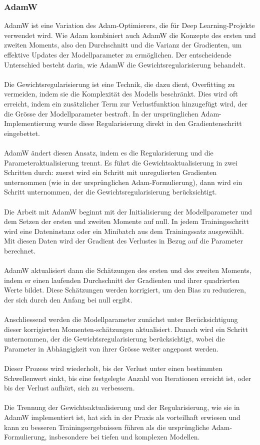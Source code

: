 \documentclass{article}
\begin{document}
\subsubsection{AdamW}
AdamW \cite{loshchilov_decoupled_2019} ist eine Variation des Adam-Optimierers, die für Deep Learning-Projekte verwendet wird. Wie Adam kombiniert auch AdamW die Konzepte des ersten und zweiten Moments, also den Durchschnitt und die Varianz der Gradienten, um effektive Updates der Modellparameter zu ermöglichen. Der entscheidende Unterschied besteht darin, wie AdamW die Gewichtsregularisierung behandelt.\\\\
Die Gewichtsregularisierung ist eine Technik, die dazu dient, Overfitting zu vermeiden, indem sie die Komplexität des Modells beschränkt. Dies wird oft erreicht, indem ein zusätzlicher Term zur Verlustfunktion hinzugefügt wird, der die Grösse der Modellparameter bestraft. In der ursprünglichen Adam-Implementierung wurde diese Regularisierung direkt in den Gradientenschritt eingebettet.\\\\
AdamW ändert diesen Ansatz, indem es die Regularisierung und die Parameteraktualisierung trennt. Es führt die Gewichtsaktualisierung in zwei Schritten durch: zuerst wird ein Schritt mit unregulierten Gradienten unternommen (wie in der ursprünglichen Adam-Formulierung), dann wird ein Schritt unternommen, der die Gewichtsregularisierung berücksichtigt.\\\\
Die Arbeit mit AdamW beginnt mit der Initialisierung der Modellparameter und dem Setzen der ersten und zweiten Momente auf null. In jedem Trainingsschritt wird eine Dateninstanz oder ein Minibatch aus dem Trainingssatz ausgewählt. Mit diesen Daten wird der Gradient des Verlustes in Bezug auf die Parameter berechnet.\\\\
AdamW aktualisiert dann die Schätzungen des ersten und des zweiten Moments, indem er einen laufenden Durchschnitt der Gradienten und ihrer quadrierten Werte bildet. Diese Schätzungen werden korrigiert, um den Bias zu reduzieren, der sich durch den Anfang bei null ergibt.\\\\
Anschliessend werden die Modellparameter zunächst unter Berücksichtigung dieser korrigierten Momenten-schätzungen aktualisiert. Danach wird ein Schritt unternommen, der die Gewichtsregularisierung berücksichtigt, wobei die Parameter in Abhängigkeit von ihrer Grösse weiter angepasst werden.\\\\
Dieser Prozess wird wiederholt, bis der Verlust unter einen bestimmten Schwellenwert sinkt, bis eine festgelegte Anzahl von Iterationen erreicht ist, oder bis der Verlust aufhört, sich zu verbessern.\\\\
Die Trennung der Gewichtsaktualisierung und der Regularisierung, wie sie in AdamW implementiert ist, hat sich in der Praxis als vorteilhaft erwiesen und kann zu besseren Trainingsergebnissen führen als die ursprüngliche Adam-Formulierung, insbesondere bei tiefen und komplexen Modellen.
\end{document}
